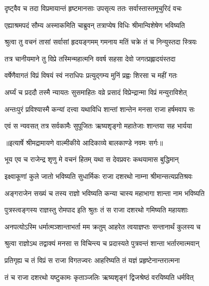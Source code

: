 \twolineshloka
{दृष्ट्वैव च तदा विप्रमायान्तं हृष्टमानसाः}
{उपसृत्य ततः सर्वास्तास्तमूचुरिदं वचः} %

\twolineshloka
{एह्याश्रमपदं सौम्य अस्माकमिति चाब्रुवन्}
{तत्राप्येष विधिः श्रीमान्विशेषेण भविष्यति} %

\twolineshloka
{श्रुत्वा तु वचनं तासां सर्वासां हृदयङ्गमम्}
{गमनाय मतिं चक्रे तं च निन्युस्तदा स्त्रियः} %

\twolineshloka
{तत्र चानीयमाने तु विप्रे तस्मिन्महात्मनि}
{ववर्ष सहसा देवो जगत्प्रह्लादयंस्तदा} %

\twolineshloka
{वर्षेणैवागतं विप्रं विषयं स्वं नराधिपः}
{प्रत्युद्गम्य मुनिं प्रह्वः शिरसा च महीं गतः} %

\twolineshloka
{अर्घ्यं च प्रददौ तस्मै न्यायतः सुसमाहितः}
{वव्रे प्रसादं विप्रेन्द्रान्मा विप्रं मन्युराविशेत्} %

\twolineshloka
{अन्तःपुरं प्रविश्यास्मै कन्यां दत्त्वा यथाविधि}
{शान्तां शान्तेन मनसा राजा हर्षमवाप सः} %

\twolineshloka
{एवं स न्यवसत् तत्र सर्वकामैः सुपूजितः}
{ऋष्यशृङ्गो महातेजाः शान्तया सह भार्यया} %


{॥इत्यार्षे श्रीमद्रामायणे वाल्मीकीये आदिकाव्ये बालकाण्डे नवमः सर्गः॥}


\twolineshloka
{भूय एव च राजेन्द्र शृणु मे वचनं हितम्}
{यथा स देवप्रवरः कथयामास बुद्धिमान्} %

\twolineshloka
{इक्ष्वाकूणां कुले जातो भविष्यति सुधार्मिकः}
{राजा दशरथो नाम्ना श्रीमान्सत्यप्रतिश्रवः} %

\twolineshloka
{अङ्गराजेन सख्यं च तस्य राज्ञो भविष्यति}
{कन्या चास्य महाभागा शान्ता नाम भविष्यति} %

\twolineshloka
{पुत्रस्त्वङ्गस्य राज्ञस्तु रोमपाद इति श्रुतः}
{तं स राजा दशरथो गमिष्यति महायशाः} %

\twolineshloka
{अनपत्योऽस्मि धर्मात्मञ्शान्ताभर्ता मम क्रतुम्}
{आहरेत त्वयाज्ञप्तः सन्तानार्थं कुलस्य च} %

\twolineshloka
{श्रुत्वा राज्ञोऽथ तद्वाक्यं मनसा स विचिन्त्य च}
{प्रदास्यते पुत्रवन्तं शान्ता भर्तारमात्मवान्} %

\twolineshloka
{प्रतिगृह्य च तं विप्रं स राजा विगतज्वरः}
{आहरिष्यति तं यज्ञं प्रहृष्टेनान्तरात्मना} %

\twolineshloka
{तं च राजा दशरथो यष्टुकामः कृताञ्जलिः}
{ऋष्यशृङ्गं द्विजश्रेष्ठं वरयिष्यति धर्मवित्} %


